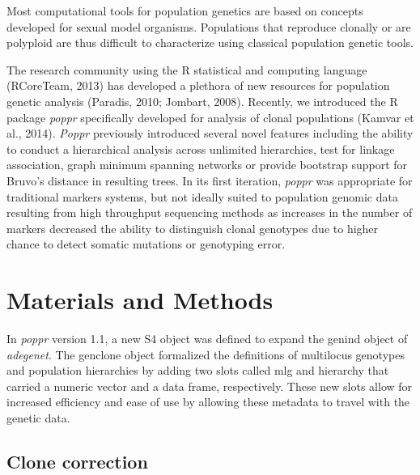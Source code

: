 \documentclass{frontiersSCNS} %
\begin{document}
Most computational tools for population genetics are based on concepts
developed for sexual model organisms. Populations that reproduce
clonally or are polyploid are thus difficult to characterize using
classical population genetic tools.

The research community using the R statistical and computing language
(RCoreTeam, 2013) has developed a plethora of new resources for
population genetic analysis (Paradis, 2010; Jombart, 2008). Recently, we
introduced the R package \emph{poppr} specifically developed for
analysis of clonal populations (Kamvar et al., 2014). \emph{Poppr}
previously introduced several novel features including the ability to
conduct a hierarchical analysis across unlimited hierarchies, test for
linkage association, graph minimum spanning networks or provide
bootstrap support for Bruvo's distance in resulting trees. In its first
iteration, \emph{poppr} was appropriate for traditional markers systems,
but not ideally suited to population genomic data resulting from high
throughput sequencing methods as increases in the number of markers
decreased the ability to distinguish clonal genotypes due to higher
chance to detect somatic mutations or genotyping error.

\section*{Materials and Methods}\label{materials-and-methods}

In \emph{poppr} version 1.1, a new S4 object was defined to expand the
genind object of \emph{adegenet}. The genclone object formalized the
definitions of multilocus genotypes and population hierarchies by adding
two slots called mlg and hierarchy that carried a numeric vector and a
data frame, respectively. These new slots allow for increased efficiency
and ease of use by allowing these metadata to travel with the genetic
data.

\subsection*{Clone correction}\label{clone-correction}
\end{document}
